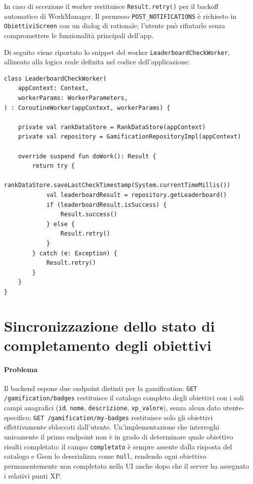 \documentclass[a4paper,12pt]{report}
\begin{document}
    In caso di eccezione il worker restituisce \texttt{Result.retry()} per il backoff
    automatico di WorkManager. Il permesso \texttt{POST\_NOTIFICATIONS} è richiesto
    in \texttt{ObiettiviScreen} con un dialog di rationale; l'utente può rifiutarlo
    senza compromettere le funzionalità principali dell'app.

    Di seguito viene riportato lo snippet del worker \texttt{LeaderboardCheckWorker}, allineato alla logica reale definita nel codice dell'applicazione:

    \begin{lstlisting}
class LeaderboardCheckWorker(
    appContext: Context,
    workerParams: WorkerParameters,
) : CoroutineWorker(appContext, workerParams) {

    private val rankDataStore = RankDataStore(appContext)
    private val repository = GamificationRepositoryImpl(appContext)

    override suspend fun doWork(): Result {
        return try {
            rankDataStore.saveLastCheckTimestamp(System.currentTimeMillis())
            val leaderboardResult = repository.getLeaderboard()
            if (leaderboardResult.isSuccess) {
                Result.success()
            } else {
                Result.retry()
            }
        } catch (e: Exception) {
            Result.retry()
        }
    }
}
    \end{lstlisting}

    \section{Sincronizzazione dello stato di completamento degli obiettivi}

    \paragraph{Problema}
    Il backend espone due endpoint distinti per la gamification: \texttt{GET /gamification/badges}
    restituisce il catalogo completo degli obiettivi con i soli campi anagrafici
    (\texttt{id}, \texttt{nome}, \texttt{descrizione}, \texttt{xp\_valore}), senza alcun
    dato utente-specifico; \texttt{GET /gamification/my-badges} restituisce solo gli obiettivi
    effettivamente sbloccati dall'utente. Un'implementazione che interroghi unicamente il
    primo endpoint non è in grado di determinare quale obiettivo risulti completato:
    il campo \texttt{completato} è sempre assente dalla risposta del catalogo e Gson lo
    deserializza come \texttt{null}, rendendo ogni obiettivo permanentemente non completato
    nella UI anche dopo che il server ha assegnato i relativi punti XP.
\end{document}
